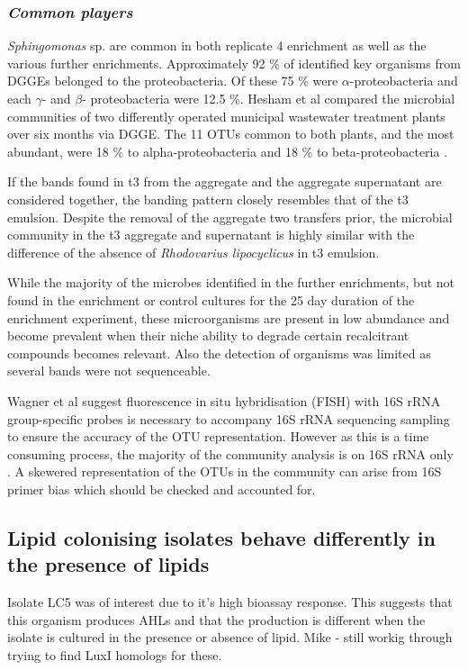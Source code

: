 \documentclass[11pt]{article}
\begin{document}
\subsubsection{\emph{Common players}}
\emph{Sphingomonas} sp. are common in both replicate 4 enrichment as well as the various further enrichments.
Approximately 92 \% of identified key organisms from DGGEs belonged to the proteobacteria. Of these 75 \% were \emph{$\alpha$}-proteobacteria  and each \emph{$\gamma$}- and \emph{$\beta$}- proteobacteria were 12.5 \%.
Hesham et al compared the microbial communities of two differently operated municipal wastewater treatment plants over six months via DGGE. The 11 OTUs common to both plants, and the most abundant, were 18 \% to alpha-proteobacteria and 18 \% to beta-proteobacteria \cite{Hesham_11}.

If the bands found in t3 from the aggregate and the aggregate supernatant are considered together, the banding pattern closely resembles that of the t3 emulsion. Despite the removal of the aggregate two transfers prior, the microbial community in the t3 aggregate and supernatant is highly similar with the difference of the absence of \emph{Rhodovarius lipocyclicus} in t3 emulsion.


While the majority of the microbes identified in the further enrichments, but not found in the enrichment or control cultures for the 25 day duration of the enrichment experiment, these microorganisms are present in low abundance and become prevalent when their niche ability to degrade certain recalcitrant compounds becomes relevant. Also the detection of organisms was limited as several bands were not sequenceable.

Wagner et al suggest fluorescence in situ hybridisation (FISH) with 16S rRNA  group-specific probes is necessary to accompany 16S rRNA sequencing sampling to ensure the accuracy of the OTU representation. However as this is a time consuming process, the majority of the community analysis is on 16S rRNA only \cite{Wagner_02} . A skewered representation of the OTUs in the community can arise from 16S primer bias which should be checked and accounted for.

\subsection{Lipid colonising isolates behave differently in the presence of lipids}



Isolate LC5 was of interest due to it's high bioassay response. This suggests that this organism produces AHLs and that the production is different when the isolate is cultured in the presence or absence of lipid.
Mike - still workig through trying to find LuxI homologs for these.
\end{document}
